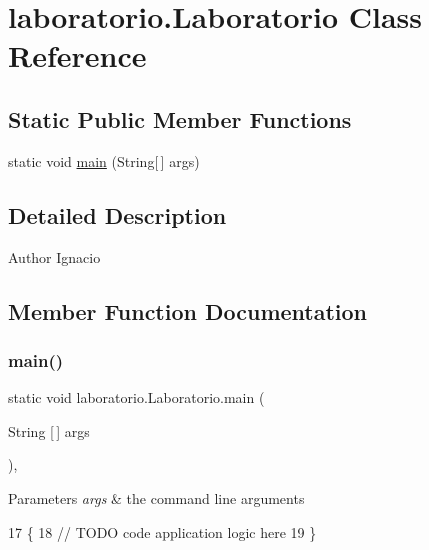 \hypertarget{classlaboratorio_1_1_laboratorio}{}\section{laboratorio.\+Laboratorio Class Reference}
\label{classlaboratorio_1_1_laboratorio}
\subsection*{Static Public Member Functions}
\begin{DoxyCompactItemize}
\item 
static void \mbox{\hyperlink{classlaboratorio_1_1_laboratorio_a8a30073b1b0443f5c4cc5a8823eab544}{main}} (String\mbox{[}$\,$\mbox{]} args)
\end{DoxyCompactItemize}


\subsection{Detailed Description}
\begin{DoxyAuthor}{Author}
Ignacio 
\end{DoxyAuthor}


\subsection{Member Function Documentation}
\mbox{\label{classlaboratorio_1_1_laboratorio_a8a30073b1b0443f5c4cc5a8823eab544}} 
\subsubsection{\texorpdfstring{main()}{main()}}
{\footnotesize\ttfamily static void laboratorio.\+Laboratorio.\+main (\begin{DoxyParamCaption}\item[{String \mbox{[}$\,$\mbox{]}}]{args }\end{DoxyParamCaption})\hspace{0.3cm}{\ttfamily [inline]}, {\ttfamily [static]}}


\begin{DoxyParams}{Parameters}
{\em args} & the command line arguments \\
\hline
\end{DoxyParams}

\begin{DoxyCode}
17                                            \{
18         \textcolor{comment}{// TODO code application logic here}
19     \}
\end{DoxyCode}
